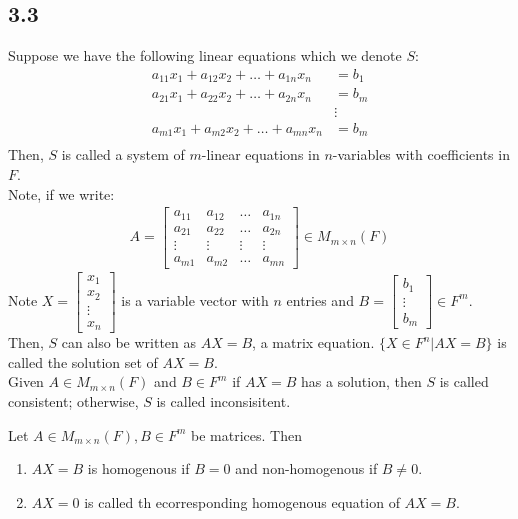 \documentclass[12pt, letterpaper]{article}
\begin{document}
  \subsection*{3.3}
  \begin{definition}
    Suppose we have the following linear equations which we denote $S$:
    \begin{align*}
      a_{11}x_1 + a_{12}x_2 + \ldots + a_{1n}x_n &= b_1 \\
      a_{21}x_1 + a_{22}x_2 + \ldots + a_{2n}x_n &= b_m \\
      & \vdots \\
      a_{m1}x_1 + a_{m2}x_2 + \ldots + a_{mn}x_n &= b_m \\
    \end{align*}
    Then, $S$ is called a system of $m$-linear equations in $n$-variables with coefficients in $F$.
    \\
    Note, if we write:
    \begin{align*}
      A = 
      \begin{bmatrix}
        a_{11} & a_{12} & \ldots & a_{1n} \\
        a_{21} & a_{22} & \ldots & a_{2n} \\
        \vdots & \vdots & \vdots & \vdots \\
        a_{m1} & a_{m2} & \ldots & a_{mn}
      \end{bmatrix}
      \in M_{m\times n}(F)
    \end{align*}
    Note $X = 
    \begin{bmatrix}
      x_1 \\
      x_2 \\
      \vdots \\
      x_n
    \end{bmatrix}
    $ is a variable vector  with $n$ entries
    and $B = 
    \begin{bmatrix}
      b_1 \\
      \vdots \\
      b_m
    \end{bmatrix}
    \in F^m$.
    Then, $S$ can also be written as $AX = B$, a matrix equation.
    $\{X \in F^n | AX=B\}$ is called the solution set of $AX=B$.
    \\
    Given $A \in M_{m\times n}(F)$ and $B \in F^m$ if $AX = B$ has a solution, then $S$ is called consistent; otherwise, $S$ is called inconsisitent.
  \end{definition}
  \begin{definition}
    Let $A \in M_{m\times n}(F), B \in F^m$ be matrices.
    Then
    \begin{enumerate}
      \item $AX = B$ is homogenous if $B=0$ and non-homogenous if $B \neq 0$.
      \item $AX = 0$ is called th ecorresponding homogenous equation of $AX = B$.
    \end{enumerate}
  \end{definition}
\end{document}
